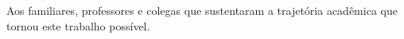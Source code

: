 
\begin{dedicatoria}%

Aos familiares, professores e colegas que sustentaram a trajetória acadêmica que tornou este trabalho possível.

\end{dedicatoria}
